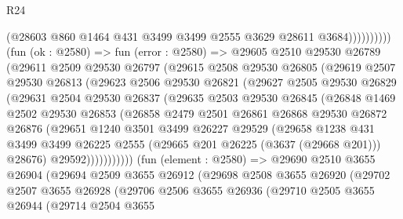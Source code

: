 \begin{lexlean}{R24}
\begin{coremodule}
                          (@28603 @860 @1464 @431 @3499 @3499 @2555 @3629 @28611 @3684))))))))))
        (fun (ok : @2580) =>
        fun (error : @2580) =>
        @29605
          @2510
          @29530
          @26789
          (@29611
            @2509
            @29530
            @26797
            (@29615
              @2508
              @29530
              @26805
              (@29619
                @2507
                @29530
                @26813
                (@29623
                  @2506
                  @29530
                  @26821
                  (@29627
                    @2505
                    @29530
                    @26829
                    (@29631
                      @2504
                      @29530
                      @26837
                      (@29635
                        @2503
                        @29530
                        @26845
                        (@26848
                          @1469
                          @2502
                          @29530
                          @26853
                          (@26858
                            @2479
                            @2501
                            @26861
                            @26868
                            @29530
                            @26872
                            @26876
                            (@29651
                              @1240
                              @3501
                              @3499
                              @26227
                              @29529
                              (@29658
                                @1238
                                @431
                                @3499
                                @3499
                                @26225
                                @2555
                                (@29665 @201 @26225 (@3637 (@29668 @201)))
                                @28676)
                              @29592)))))))))))
        (fun (element : @2580) =>
        @29690
          @2510
          @3655
          @26904
          (@29694
            @2509
            @3655
            @26912
            (@29698
              @2508
              @3655
              @26920
              (@29702
                @2507
                @3655
                @26928
                (@29706
                  @2506
                  @3655
                  @26936
                  (@29710
                    @2505
                    @3655
                    @26944
                    (@29714
                      @2504
                      @3655

\end{coremodule}
\end{lexlean}
